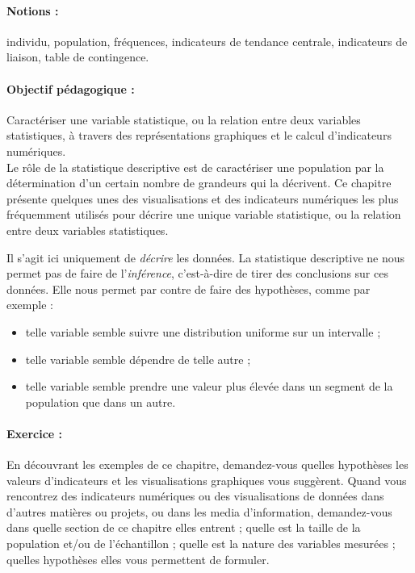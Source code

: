 \label{chap:stat_descr}
\paragraph{Notions :} individu, population, fréquences, indicateurs de tendance
centrale, indicateurs de liaison, table de contingence.

\paragraph{Objectif pédagogique :}
Caractériser une variable statistique, ou la relation entre deux variables
statistiques, à travers des représentations graphiques et le calcul
d'indicateurs numériques.\\

Le rôle de la statistique descriptive est de caractériser une population par la
détermination d'un certain nombre de grandeurs qui la décrivent. Ce chapitre
présente quelques unes des visualisations et des indicateurs numériques les
plus fréquemment utilisés pour décrire une unique variable statistique, ou la
relation entre deux variables statistiques.

Il s'agit ici uniquement de \textit{décrire} les données. La statistique
descriptive ne nous permet pas de faire de l'\textit{inférence}, c'est-à-dire
de tirer des conclusions sur ces données. Elle nous permet par contre de faire
des hypothèses, comme par exemple :
\begin{itemize}
	\item telle variable semble suivre une distribution uniforme sur un intervalle ;
	\item telle variable semble dépendre de telle autre ;
	\item telle variable semble prendre une valeur plus élevée dans un segment de
	la population que dans un autre.
\end{itemize}

\paragraph{Exercice :} En découvrant les exemples de ce chapitre, demandez-vous
quelles hypothèses les valeurs d'indicateurs et les visualisations graphiques
vous suggèrent.  Quand vous rencontrez des indicateurs numériques ou des
visualisations de données dans d'autres matières ou projets, ou dans les media
d'information, demandez-vous dans quelle section de ce chapitre elles entrent ;
quelle est la taille de la population et/ou de l'échantillon ; quelle est la
nature des variables mesurées ; quelles hypothèses elles vous permettent de
formuler.


